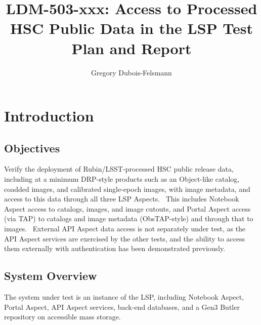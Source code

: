 \documentclass[DM,lsstdraft,STR,toc]{lsstdoc}
\begin{document}
\def\milestoneName{Access to Processed HSC Public Data in the LSP}
\def\milestoneId{LDM-503-xxx}
\def\product{LSP Services}


\title{LDM-503-xxx: Access to Processed HSC Public Data in the LSP Test Plan and Report}
\setDocRef{\lsstDocType-\lsstDocNum}
\date{\vcsdate}
\author{ Gregory Dubois-Felsmann }






\maketitle

\section{Introduction}
\label{sect:intro}


\subsection{Objectives}
\label{sect:objectives}

 Verify the deployment of Rubin/LSST-processed HSC public release data,
including at a minimum DRP-style products such as an Object-like
catalog, coadded images, and calibrated single-epoch images, with image
metadata, and access to this data through all three LSP Aspects. ~This
includes Notebook Aspect access to catalogs, images, and image cutouts,
and Portal Aspect access (via TAP) to catalogs and image metadata
(ObsTAP-style) and through that to images. ~External API Aspect data
access is not separately under test, as the API Aspect services are
exercised by the other tests, and the ability to access them externally
with authentication has been demonstrated previously.



\subsection{System Overview}
\label{sect:systemoverview}

 The system under test is an instance of the LSP, including Notebook
Aspect, Portal Aspect, API Aspect services, back-end databases, and a
Gen3 Butler repository on accessible mass storage.
\end{document}
